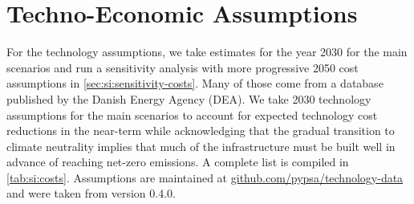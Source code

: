 \section{Techno-Economic Assumptions}
\label{sec:si:costs}

For the technology assumptions, we take estimates for the year 2030 for the main
scenarios and run a sensitivity analysis with more progressive 2050 cost
assumptions in \cref{sec:si:sensitivity-costs}.  Many of those come from a
database published by the Danish Energy Agency (DEA). We take 2030
technology assumptions for the main scenarios to account for expected technology
cost reductions in the near-term while acknowledging that the gradual transition
to climate neutrality implies that much of the infrastructure must be built well
in advance of reaching net-zero emissions. A complete list is compiled in
\cref{tab:si:costs}. Assumptions are maintained at
\href{https://github.com/pypsa/technology-data}{github.com/pypsa/technology-data}
and were taken from version 0.4.0.

\begin{landscape}

\begin{footnotesize}

\end{footnotesize}

\end{landscape}

\restoregeometry